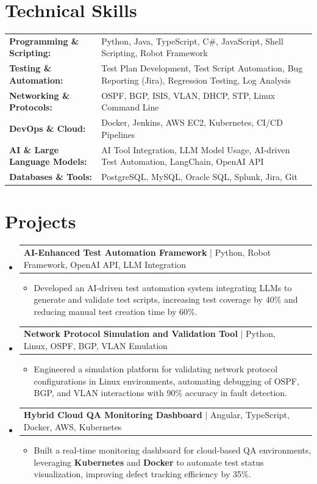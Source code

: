 \documentclass[letterpaper,10pt]{article}
\makeatletter
\newcommand{\resumeItem}[1]{
  \item{\fontsize{8pt}{9pt}\selectfont
    #1 \vspace{-3pt}
  }
}
\newcommand{\resumeProjectHeading}[2]{
    \item
    \begin{tabular*}{1.001\textwidth}{l@{\extracolsep{\fill}}r}
      \fontsize{8.5pt}{10pt}#1 & \textbf{\fontsize{8.5pt}{10pt} #2}\\
    \end{tabular*}\vspace{-7pt}
}
\newcommand{\resumeSubHeadingListStart}{\begin{itemize}[leftmargin=0pt, label={}]}
\newcommand{\resumeSubHeadingListEnd}{\end{itemize}}
\newcommand{\resumeItemListStart}{\begin{itemize}[leftmargin=*]}
\newcommand{\resumeItemListEnd}{\end{itemize}\vspace{-5pt}}
\makeatother
\begin{document}
\section{Technical Skills}
        \vspace{-14pt}
        \begin{table}[h]
            \fontsize{8pt}{9pt}\selectfont
            \begin{tabular}{p{0.3\linewidth} p{0.7\linewidth}}
                \textbf{Programming \& Scripting:} & Python, Java, TypeScript, C\#, JavaScript, Shell Scripting, Robot Framework \\
                \textbf{Testing \& Automation:} & Test Plan Development, Test Script Automation, Bug Reporting (Jira), Regression Testing, Log Analysis \\
                \textbf{Networking \& Protocols:} & OSPF, BGP, ISIS, VLAN, DHCP, STP, Linux Command Line \\
                \textbf{DevOps \& Cloud:} & Docker, Jenkins, AWS EC2, Kubernetes, CI/CD Pipelines \\
                \textbf{AI \& Large Language Models:} & AI Tool Integration, LLM Model Usage, AI-driven Test Automation, LangChain, OpenAI API \\
                \textbf{Databases \& Tools:} & PostgreSQL, MySQL, Oracle SQL, Splunk, Jira, Git \\
            \end{tabular}
        \end{table}
 \vspace{-18pt}

\section{Projects}
    \vspace{-5pt}
    \resumeSubHeadingListStart
          \resumeProjectHeading
            {\textbf{AI-Enhanced Test Automation Framework} | Python, Robot Framework, OpenAI API, LLM Integration}{}
            \resumeItemListStart
                \resumeItem{Developed an AI-driven test automation system integrating LLMs to generate and validate test scripts, increasing test coverage by 40\% and reducing manual test creation time by 60\%.}
            \resumeItemListEnd
        \vspace{-12pt}
    
        \resumeProjectHeading
            {\textbf{Network Protocol Simulation and Validation Tool} | Python, Linux, OSPF, BGP, VLAN Emulation}{}
        \resumeItemListStart
                \resumeItem{Engineered a simulation platform for validating network protocol configurations in Linux environments, automating debugging of OSPF, BGP, and VLAN interactions with 90\% accuracy in fault detection.}
        \resumeItemListEnd
      \vspace{-12pt}
      \resumeProjectHeading
        {\textbf{Hybrid Cloud QA Monitoring Dashboard} | Angular, TypeScript, Docker, AWS, Kubernetes}{}
    \resumeItemListStart
            \resumeItem{Built a real-time monitoring dashboard for cloud-based QA environments, leveraging \textbf{Kubernetes} and \textbf{Docker} to automate test status visualization, improving defect tracking efficiency by 35\%.}
    \resumeItemListEnd
    \resumeSubHeadingListEnd
\end{document}
